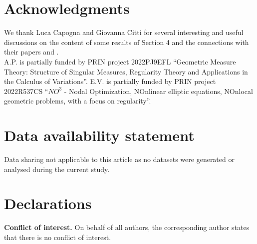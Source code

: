 \documentclass[10pt]{amsart}
\numberwithin{equation}{section}
\theoremstyle{definition}
\begin{document}
\medskip



\section*{Acknowledgments} We thank Luca Capogna and Giovanna Citti for several interesting and useful discussions on the content of some results of Section 4 and the connections with their papers \cite{CapoCitti3} and \cite{CapoCitti4}. \\ 
A.P. is partially funded by PRIN project 2022PJ9EFL ``Geometric Measure Theory: Structure of Singular Measures, Regularity Theory and Applications in the Calculus of Variations''.
E.V. is partially funded by PRIN project 2022R537CS ``$NO^3$ - Nodal Optimization, NOnlinear elliptic equations, NOnlocal geometric problems, with a focus on regularity''.

\section*{Data availability statement}
Data sharing not applicable to this article as no datasets were generated or analysed during
the current study.

\section*{Declarations}
\textbf{Conflict of interest.} On behalf of all authors, the corresponding author states that there is no conflict of interest.
\end{document}
